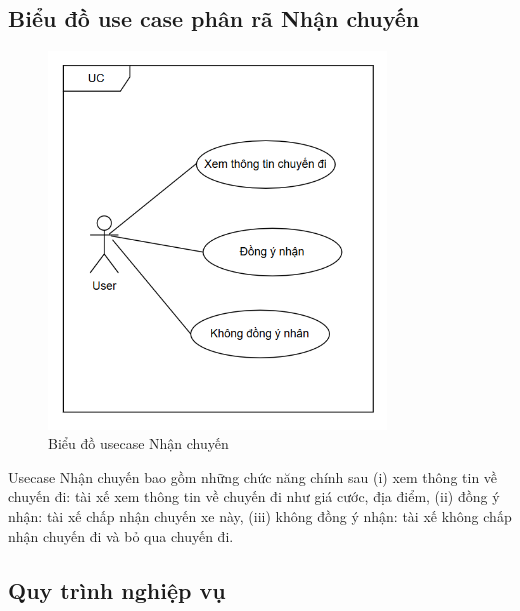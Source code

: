 \documentclass[../DoAn.tex]{subfiles}
\begin{document}
\subsection{Biểu đồ use case phân rã Nhận chuyến}
\label{subsection:2.2.5}
\begin{figure}[H]
  \centering
  \includegraphics[width=0.8\textwidth]{Hinhve/Usecase_nhan_chuyen.png}
  \caption{Biểu đồ usecase Nhận chuyến}
  \label{fig:use_case_nhan_chuyen}
\end{figure}
Usecase Nhận chuyến bao gồm những chức năng chính sau (i) xem thông tin về chuyến đi: tài xế xem thông tin về chuyến đi như giá cước, địa điểm, (ii) đồng ý nhận: tài xế chấp nhận chuyến xe này, (iii) không đồng ý nhận: tài xế không chấp nhận chuyến đi và bỏ qua chuyến đi.


\subsection{Quy trình nghiệp vụ}
\label{section:2.3}
\end{document}
